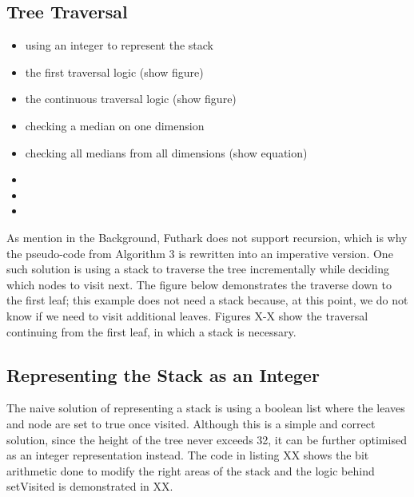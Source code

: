 \subsection{Tree Traversal}
\label{sec:traversal}


\begin{itemize}
	\item using an integer to represent the stack
	\item the first traversal logic (show figure)
	\item the continuous traversal logic (show figure)
	\item checking a median on one dimension
	\item checking all medians from all dimensions (show equation)
	\item 
	\item 
	\item 
\end{itemize}	


As mention in the Background, Futhark does not support recursion, which is why the pseudo-code from Algorithm 3 is rewritten into an imperative version. One such solution is using a stack to traverse the tree incrementally while deciding which nodes to visit next. The figure below demonstrates the traverse down to the first leaf; this example does not need a stack because, at this point, we do not know if we need to visit additional leaves. Figures X-X show the traversal continuing from the first leaf, in which a stack is necessary. 


\subsection{Representing the Stack as an Integer}

The naive solution of representing a stack is using a boolean list where the leaves and node are set to true once visited. Although this is a simple and correct solution, since the height of the tree never exceeds 32, it can be further optimised as an integer representation instead. The code in listing XX shows the bit arithmetic done to modify the right areas of the stack and the logic behind setVisited is demonstrated in XX. 

